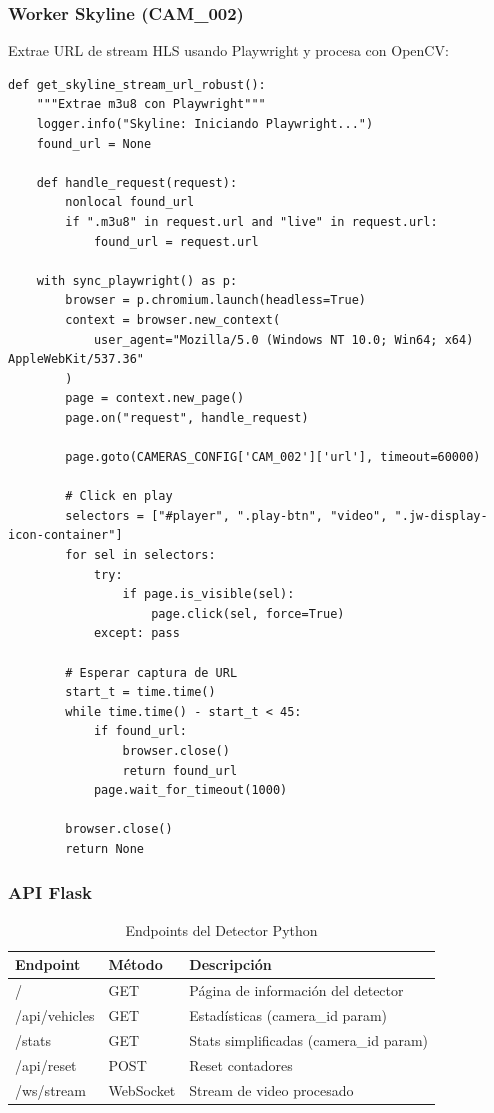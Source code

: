 \documentclass[12pt,a4paper]{article}
\begin{document}
\subsubsection{Worker Skyline (CAM\_002)}

Extrae URL de stream HLS usando Playwright y procesa con OpenCV:

\begin{lstlisting}[caption={Worker Skyline - Extracción HLS}, style=pythonstyle, label=lst:worker-skyline]
def get_skyline_stream_url_robust():
    """Extrae m3u8 con Playwright"""
    logger.info("Skyline: Iniciando Playwright...")
    found_url = None
    
    def handle_request(request):
        nonlocal found_url
        if ".m3u8" in request.url and "live" in request.url:
            found_url = request.url
    
    with sync_playwright() as p:
        browser = p.chromium.launch(headless=True)
        context = browser.new_context(
            user_agent="Mozilla/5.0 (Windows NT 10.0; Win64; x64) AppleWebKit/537.36"
        )
        page = context.new_page()
        page.on("request", handle_request)
        
        page.goto(CAMERAS_CONFIG['CAM_002']['url'], timeout=60000)
        
        # Click en play
        selectors = ["#player", ".play-btn", "video", ".jw-display-icon-container"]
        for sel in selectors:
            try:
                if page.is_visible(sel):
                    page.click(sel, force=True)
            except: pass
        
        # Esperar captura de URL
        start_t = time.time()
        while time.time() - start_t < 45:
            if found_url:
                browser.close()
                return found_url
            page.wait_for_timeout(1000)
        
        browser.close()
        return None
\end{lstlisting}

\subsubsection{API Flask}

\begin{table}[H]
\centering
\begin{tabular}{|l|l|p{5cm}|}
\hline
\textbf{Endpoint} & \textbf{Método} & \textbf{Descripción} \\
\hline
/ & GET & Página de información del detector \\
\hline
/api/vehicles & GET & Estadísticas (camera\_id param) \\
\hline
/stats & GET & Stats simplificadas (camera\_id param) \\
\hline
/api/reset & POST & Reset contadores \\
\hline
/ws/stream & WebSocket & Stream de video procesado \\
\hline
\end{tabular}
\caption{Endpoints del Detector Python}
\end{table}
\end{document}
